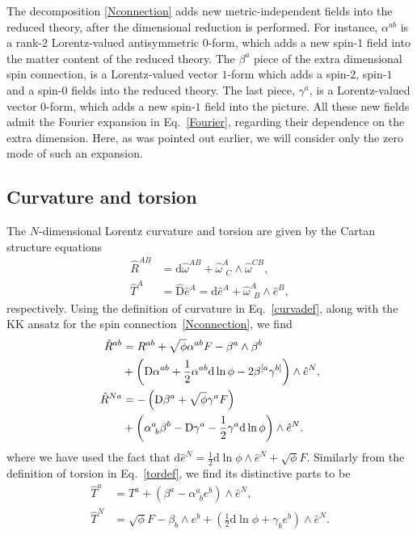 \documentclass[aps,prd,12pt,superscriptaddress,showpacs,showkeys,longbibliography,reprint,nofootinbib]{revtex4-1}
\begin{document}
The decomposition \eqref{Nconnection} adds new metric-independent fields into the reduced theory, after the dimensional reduction is performed. For instance, $\alpha^{ab}$ is a rank-2 Lorentz-valued antisymmetric $0$-form, which adds a new spin-$1$ field into the matter content of the reduced theory. The $\beta^a$ piece of the extra dimensional spin connection, is a Lorentz-valued vector $1$-form which adds a spin-$2$, spin-$1$ and a spin-$0$ fields into the reduced theory. The last piece, $\gamma^a$, is a Lorentz-valued vector $0$-form, which adds a new spin-$1$ field into the picture. All these new fields admit the Fourier expansion in Eq.~\eqref{Fourier}, regarding their dependence on the extra dimension. Here, as was pointed out earlier, we will consider only the zero mode of such an expansion.


\subsection{Curvature and torsion}

The $N$-dimensional Lorentz curvature and torsion are given by the Cartan structure equations
\begin{align}
\label{curvadef}
\hat{R}^{AB} &= \mbox{d}\hat{\omega}^{AB}+\hat{\omega}^A_{\ \ C}\wedge\hat{\omega}^{CB}, \\
\label{tordef}
\hat{T}^A &= \hat{\mbox{D}}\hat{e}^A=\mbox{d}\hat{e}^A+\hat{\omega}^A_{\ \ B}\wedge\hat{e}^B,
\end{align}
respectively. Using the definition of curvature in Eq.~\eqref{curvadef}, along with the KK ansatz for the spin connection~\eqref{Nconnection}, we find
\begin{align}\label{R1}
  \hat{R}^{ab}&=R^{ab}+\sqrt{\phi}\alpha^{ab}F-\beta^a\wedge\beta^b\notag\\
  &+\left(\mbox{D}\alpha^{ab}+\frac{1}{2}\alpha^{ab}\mbox{d}\ln\phi-2\beta^{[a}\gamma^{b]}\right)\wedge\hat{e}^N,\\
  \label{R2}
  \hat{R}^{Na}&=-\left(\mbox{D}\beta^a+\sqrt{\phi}\gamma^a F\right)\notag\\
  &+\left(\alpha^a_{\ b}\beta^b-\mbox{D}\gamma^a-\frac{1}{2}\gamma^a\mbox{d}\ln\phi\right)\wedge\hat{e}^N.
\end{align}
where we have used the fact that $\mbox{d}\hat{e}^N=\frac{1}{2}\mbox{d}\ln\phi\wedge\hat{e}^N+\sqrt{\phi}F$. Similarly from the definition of torsion in Eq.~\eqref{tordef}, we find its distinctive parts to be
\begin{align}\label{T1}
  \hat{T}^a &= T^a+\left(\beta^a-\alpha^a_{\ \ b}e^b\right)\wedge\hat{e}^N,\\
  \label{T2}
  \hat{T}^N &= \sqrt{\phi}F-\beta_b\wedge e^b+\left(\frac{1}{2}\mbox{d}\ln\phi+\gamma_be^b\right)\wedge\hat{e}^N.
\end{align}
\end{document}

